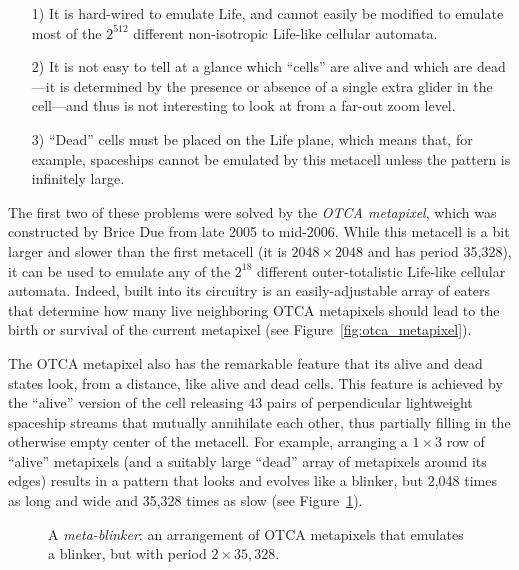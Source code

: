 \begin{itemize}
	\item[1)] It is hard-wired to emulate Life, and cannot easily be modified to emulate most of the $2^{512}$ different non-isotropic Life-like cellular automata.\smallskip
	
	\item[2)] It is not easy to tell at a glance which ``cells'' are alive and which are dead---it is determined by the presence or absence of a single extra glider in the cell---and thus is not interesting to look at from a far-out zoom level.\smallskip
	
	\item[3)] ``Dead'' cells must be placed on the Life plane, which means that, for example, spaceships cannot be emulated by this metacell unless the pattern is infinitely large.\smallskip
\end{itemize}

The first two of these problems were solved by the \emph{OTCA metapixel}, which was constructed by Brice Due from late 2005 to mid-2006. While this metacell is a bit larger and slower than the first metacell (it is $2048 \times 2048$ and has period 35,328), it can be used to emulate any of the $2^{18}$ different outer-totalistic Life-like cellular automata. Indeed, built into its circuitry is an easily-adjustable array of eaters that determine how many live neighboring OTCA metapixels should lead to the birth or survival of the current metapixel (see Figure~\ref{fig:otca_metapixel}). 


The OTCA metapixel also has the remarkable feature that its alive and dead states look, from a distance, like alive and dead cells. This feature is achieved by the ``alive'' version of the cell releasing $43$ pairs of perpendicular lightweight spaceship streams that mutually annihilate each other, thus partially filling in the otherwise empty center of the metacell. For example, arranging a $1 \times 3$ row of ``alive'' metapixels (and a suitably large ``dead'' array of metapixels around its edges) results in a pattern that looks and evolves like a blinker, but 2,048 times as long and wide and 35,328 times as slow (see Figure~\ref{fig:metablinker}).

\begin{figure}[!htb]
	\centering
	\caption{A \emph{meta-blinker}: an arrangement of OTCA metapixels that emulates a blinker, but with period $2 \times 35,328$.}\label{fig:metablinker}
\end{figure}

